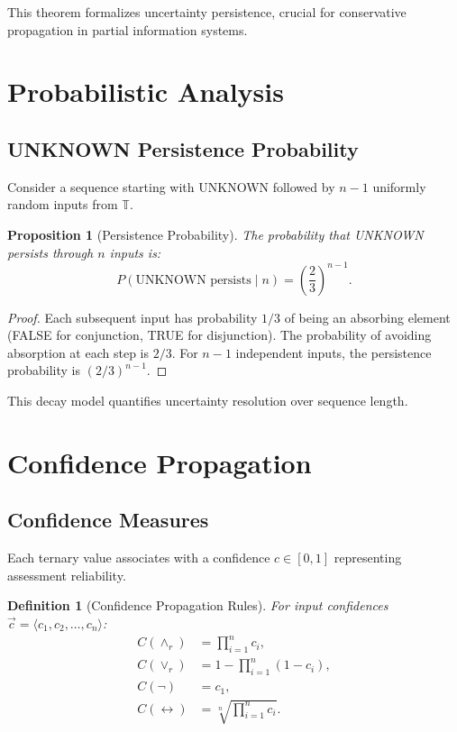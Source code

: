 \documentclass[11pt,a4paper]{article}
\newtheorem{definition}{Definition}
\newtheorem{proposition}{Proposition}
\begin{document}
This theorem formalizes uncertainty persistence, crucial for conservative propagation in partial information systems.

\section{Probabilistic Analysis}

\subsection{UNKNOWN Persistence Probability}

Consider a sequence starting with UNKNOWN followed by $n-1$ uniformly random inputs from $\mathbb{T}$.

\begin{proposition}[Persistence Probability]
The probability that UNKNOWN persists through $n$ inputs is:
\begin{equation}
P(\text{UNKNOWN persists} \mid n) = \left(\frac{2}{3}\right)^{n-1}.
\end{equation}
\end{proposition}

\begin{proof}
Each subsequent input has probability $1/3$ of being an absorbing element (FALSE for conjunction, TRUE for disjunction). The probability of avoiding absorption at each step is $2/3$. For $n-1$ independent inputs, the persistence probability is $(2/3)^{n-1}$.
\end{proof}

This decay model quantifies uncertainty resolution over sequence length.

\section{Confidence Propagation}

\subsection{Confidence Measures}

Each ternary value associates with a confidence $c \in [0,1]$ representing assessment reliability.

\begin{definition}[Confidence Propagation Rules]
For input confidences $\vec{c} = \langle c_1, c_2, \ldots, c_n \rangle$:
\begin{align}
    C(\land_r) &= \prod_{i=1}^{n} c_i, \\
    C(\lor_r) &= 1 - \prod_{i=1}^{n} (1 - c_i), \\
    C(\neg) &= c_1, \\
    C(\leftrightarrow) &= \sqrt[n]{\prod_{i=1}^{n} c_i}.
\end{align}
\end{definition}
\end{document}
